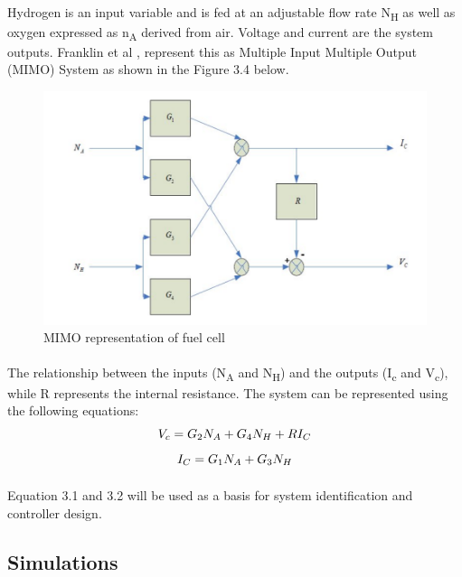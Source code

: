\paragraph{}Hydrogen is an input variable and is fed at an adjustable flow rate N\textsubscript{H} as well as oxygen expressed as n\textsubscript{A} derived from air. Voltage and current are the system outputs. Franklin et al \cite{franklin_feedback_2002}, represent this as Multiple Input Multiple Output (MIMO) System as shown in the Figure 3.4 below.
\begin{figure}[!h]
\includegraphics{Figures/mimo}
\caption{ MIMO representation of fuel cell \cite{thanapalan_model_2011}}
\end{figure}
\paragraph{}The relationship between the inputs (N\textsubscript{A} and N\textsubscript{H}) and the outputs (I\textsubscript{c} and V\textsubscript{c}), while R represents the internal resistance. The system can be represented using the following equations:
\begin{equation}
$$ V_{c} = G_{2}N_{A} + G_{4}N_{H} + RI_{C} $$
\end{equation}
\begin{equation}
$$ I_{C} = G_{1}N_{A} + G_{3}N_{H} $$
\end{equation}
\paragraph{}Equation 3.1 and 3.2 will be used as a basis for system identification and controller design.
\subsection{Simulations}
